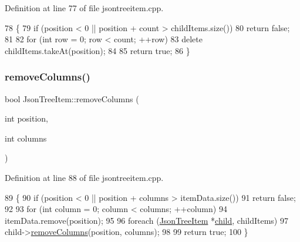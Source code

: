 Definition at line 77 of file jsontreeitem.\+cpp.


\begin{DoxyCode}
78 \{
79     \textcolor{keywordflow}{if} (position < 0 || position + count > childItems.size())
80         \textcolor{keywordflow}{return} \textcolor{keyword}{false};
81 
82     \textcolor{keywordflow}{for} (\textcolor{keywordtype}{int} row = 0; row < count; ++row)
83         \textcolor{keyword}{delete} childItems.takeAt(position);
84 
85     \textcolor{keywordflow}{return} \textcolor{keyword}{true};
86 \}
\end{DoxyCode}
\mbox{\label{class_json_tree_item_a7cb315d624881ca9fbb193c5432a82b2}} 
\subsubsection{\texorpdfstring{remove\+Columns()}{removeColumns()}}
{\footnotesize\ttfamily bool Json\+Tree\+Item\+::remove\+Columns (\begin{DoxyParamCaption}\item[{int}]{position,  }\item[{int}]{columns }\end{DoxyParamCaption})}



Definition at line 88 of file jsontreeitem.\+cpp.


\begin{DoxyCode}
89 \{
90     \textcolor{keywordflow}{if} (position < 0 || position + columns > itemData.size())
91         \textcolor{keywordflow}{return} \textcolor{keyword}{false};
92 
93     \textcolor{keywordflow}{for} (\textcolor{keywordtype}{int} column = 0; column < columns; ++column)
94         itemData.remove(position);
95 
96     \textcolor{keywordflow}{foreach} (\hyperlink{class_json_tree_item}{JsonTreeItem} *\hyperlink{class_json_tree_item_a24864c7936a43d9059277a20497341b9}{child}, childItems)
97         child->\hyperlink{class_json_tree_item_a7cb315d624881ca9fbb193c5432a82b2}{removeColumns}(position, columns);
98 
99     \textcolor{keywordflow}{return} \textcolor{keyword}{true};
100 \}
\end{DoxyCode}
\mbox{\label{class_json_tree_item_a7b60096836271a128a142c023a769e12}} 
